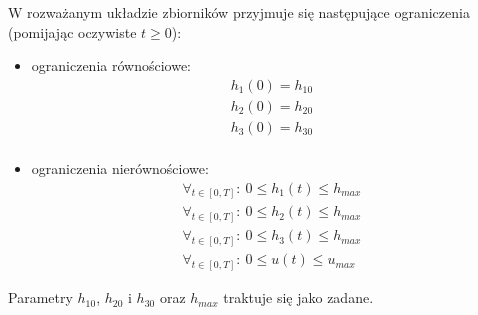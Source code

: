 W rozważanym układzie zbiorników przyjmuje się następujące ograniczenia (pomijając oczywiste $t \geq 0$):
\begin{itemize}
    \item ograniczenia równościowe:
    \begin{equation}\label{eq:model-eq-const}
    \begin{array}{lr}
        h_{1}(0) = h_{10}\\
        h_{2}(0) = h_{20}\\
        h_{3}(0) = h_{30}\\
    \end{array}
    \end{equation}
    \item ograniczenia nierównościowe:
    \begin{equation}\label{eq:model-noneq-const}
    \begin{array}{lr}
        \forall_{t \in [0, T]}:~ 0 \leq h_{1}(t) \leq h_{max}\\
        \forall_{t \in [0, T]}:~ 0 \leq h_{2}(t) \leq h_{max}\\
        \forall_{t \in [0, T]}:~ 0 \leq h_{3}(t) \leq h_{max}\\
        \forall_{t \in [0, T]}:~ 0 \leq u(t) \leq u_{max}
    \end{array}
    \end{equation}
\end{itemize}
Parametry $h_{10}$, $h_{20}$ i $h_{30}$ oraz $h_{max}$ traktuje się jako zadane.
